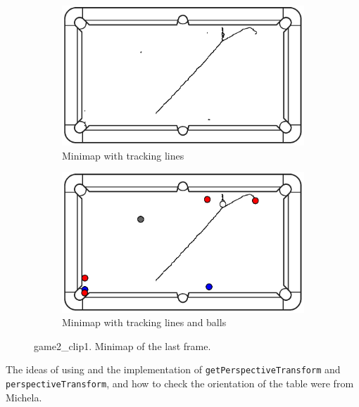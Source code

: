 \begin{figure}[H]
	\centering
	\begin{subfigure}[b]{0.48\textwidth}
		\centering
		\includegraphics[width=\textwidth]{images/Minimap/g2_c1minimap_with_track.jpg}
		\caption{Minimap with tracking lines}
		\label{fig:game2_clip1_tracking}
	\end{subfigure}
	\begin{subfigure}[b]{0.48\textwidth}
		\centering
		\includegraphics[width=\textwidth]{images/Minimap/g2_c1_minimap_with_balls.jpg}
		\caption{Minimap with tracking lines and balls}
		\label{fig:game2_clip1_balls}
	\end{subfigure}
	\caption{game2\_clip1. Minimap of the last frame.}
	\label{fig:game2_clip1_balls_and_tracking}
\end{figure}

The ideas of using and the implementation of \texttt{getPerspectiveTransform} and \texttt{perspectiveTransform}, and how to check the orientation of the table were from Michela.

